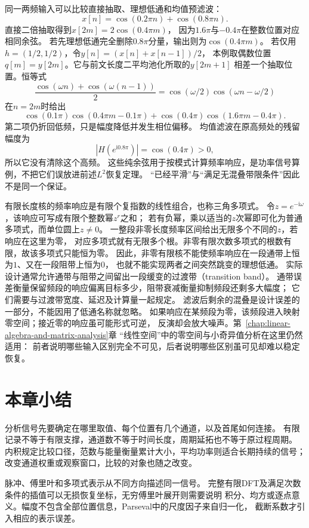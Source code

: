 同一两频输入可以比较直接抽取、理想低通和均值预滤波：
\[
  x[n]=\cos(0.2\pi n)+\cos(0.8\pi n).
\]
直接二倍抽取得到$x[2m]=2\cos(0.4\pi m)$，
因为$1.6\pi$与$-0.4\pi$在整数位置对应相同余弦。
若先理想低通完全删除$0.8\pi$分量，输出则为$\cos(0.4\pi m)$。
若仅用$h=(1/2,1/2)$，令$y[n]=(x[n]+x[n-1])/2$，
本例取偶数位置$q[m]=y[2m]$。它与前文长度二平均池化所取的$y[2m+1]$
相差一个抽取位置。恒等式
\[
  \frac{\cos(\omega n)+\cos(\omega(n-1))}{2}
  =\cos(\omega/2)\cos(\omega n-\omega/2)
\]
在$n=2m$时给出
\[
  \cos(0.1\pi)\cos(0.4\pi m-0.1\pi)
  +\cos(0.4\pi)\cos(1.6\pi m-0.4\pi).
\]
第二项仍折回低频，只是幅度降低并发生相位偏移。
均值滤波在原高频处的残留幅度为
\[
 |H(e^{\mathrm i0.8\pi})|=\cos(0.4\pi)>0,
\]
所以它没有清除这个高频。
这些纯余弦用于按模式计算频率响应，是功率信号算例，不把它们误放进前述$L^2$恢复定理。
“已经平滑”与“满足无混叠带限条件”因此不是同一个保证。

有限长度核的频率响应是有限个复指数的线性组合，也称三角多项式。
令$z=e^{-\mathrm i\omega}$，该响应可写成有限个整数幂$z^r$之和；
若有负幂，乘以适当的$z$次幂即可化为普通多项式，而单位圆上$z\neq0$。
一整段非零长度频率区间给出无限多个不同的$z$，若响应在这里为零，
对应多项式就有无限多个根。非零有限次数多项式的根数有限，故该多项式只能恒为零。
因此，非零有限核不能使频率响应在一段通带上恒为$1$、又在一段阻带上恒为$0$，
也就不能实现两者之间突然跳变的理想低通。
实际设计通常允许通带与阻带之间留出一段缓变的过渡带（transition band）。
通带误差衡量保留频段的响应偏离目标多少，阻带衰减衡量抑制频段还剩多大幅度；
它们需要与过渡带宽度、延迟及计算量一起规定。
滤波后剩余的混叠是设计误差的一部分，不能因用了低通名称就忽略。
如果响应在某频段为零，该频段进入映射零空间；接近零的响应虽可能形式可逆，
反演却会放大噪声。第~\ref{chap:linear-algebra-and-matrix-analysis}章
“线性空间”中的零空间与小奇异值分析在这里仍然适用：
前者说明哪些输入区别完全不可见，后者说明哪些区别虽可见却难以稳定恢复。

\section{本章小结}
\label{sec:signal-analysis-summary}

分析信号先要确定在哪里取值、每个位置有几个通道，以及首尾如何连接。
有限记录不等于有限支撑，通道数不等于时间长度，周期延拓也不等于原过程周期。
内积规定比较口径，范数与能量衡量累计大小，平均功率则适合长期持续的信号；
改变通道权重或观察窗口，比较的对象也随之改变。

脉冲、傅里叶和多项式表示从不同方向描述同一信号。
完整有限DFT及满足次数条件的插值可以无损恢复坐标，无穷傅里叶展开则需要说明
积分、均方或逐点意义。幅度不包含全部位置信息，Parseval中的尺度因子来自归一化，
截断系数才引入相应的表示误差。

